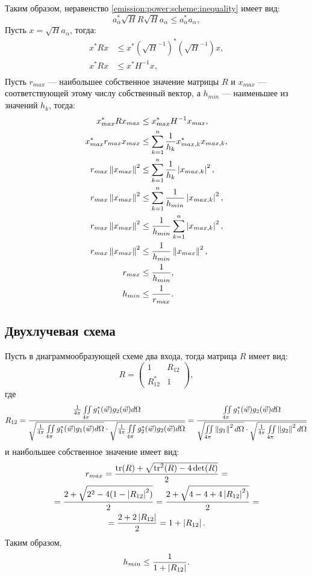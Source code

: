 Таким образом, неравенство \eqref{emission:power:scheme:inequality} имеет вид:
\[
    a_\alpha^* \sqrt{H} R \sqrt{H} a_\alpha \le a_\alpha^* a_\alpha ,
\]
Пусть $x = \sqrt{H} a_\alpha$, тогда:
\begin{align*}
    x^* R x & \le x^* (\sqrt{H}^{-1})^* (\sqrt{H}^{-1}) x , \\
    x^* R x & \le x^* H^{-1} x , \\
\end{align*}
Пусть $r_{max}$ --- наибольшее собственное значение матрицы $R$ и $x_{max}$ --- соответствующей этому числу собственный вектор, а $h_{min}$ --- наименьшее из
значений $h_k$, тогда:
\begin{align*}
    x_{max}^* R x_{max} & \le x_{max}^* H^{-1} x_{max} , \\
    x_{max}^* r_{max} x_{max} & \le \sum_{k=1}^n \frac{1}{h_k} x_{max,k}^* x_{max,k} , \\
    r_{max} \left \| x_{max} \right \|^2 & \le \sum_{k=1}^n \frac{1}{h_k} \left | x_{max,k} \right |^2 , \\
    r_{max} \left \| x_{max} \right \|^2 & \le \sum_{k=1}^n \frac{1}{h_{min}} \left | x_{max,k} \right |^2 , \\
    r_{max} \left \| x_{max} \right \|^2 & \le \frac{1}{h_{min}} \sum_{k=1}^n \left | x_{max,k} \right |^2 , \\
    r_{max} \left \| x_{max} \right \|^2 & \le \frac{1}{h_{min}} \left \| x_{max} \right \|^2 , \\
    r_{max} & \le \frac{1}{h_{min}} , \\
    h_{min} & \le \frac{1}{r_{max}} .
\end{align*}

\subsection{Двухлучевая схема}

Пусть в диаграммообразующей схеме два входа, тогда матрица $R$ имеет вид:
\[
    R
    = \begin{pmatrix}
          1        & R_{12} \\
          R_{12}^* & 1
    \end{pmatrix} ,
\]
где
\[
    R_{12}
    =
    \frac
    {\frac{1}{4 \pi} \iint \limits_{4 \pi} g_1^*(\vec{w}) g_2(\vec{w}) d \Omega}
    {\sqrt{\frac{1}{4 \pi} \iint \limits_{4 \pi} g_1^*(\vec{w}) g_1(\vec{w}) d \Omega} \cdot \sqrt{\frac{1}{4 \pi} \iint \limits_{4 \pi} g_2^*(\vec{w}) g_2(\vec{w}) d \Omega}}
    = \frac
    {\iint \limits_{4 \pi} g_1^*(\vec{w}) g_2(\vec{w}) d \Omega}
    {\sqrt{\iint \limits_{4 \pi} \left \| g_1 \right \|^2 d \Omega} \cdot \sqrt{\frac{1}{4 \pi} \iint \limits_{4 \pi} \left \| g_2 \right \|^2 d \Omega}}
\]
и наибольшее собственное значение имеет вид:
\begin{multline*}
    r_{max}
    = \frac{\operatorname{tr}(R) + \sqrt{\operatorname{tr}^2(R) - 4 \det(R)}}{2} = \\
    = \frac{2 + \sqrt{2^2 - 4 (1 - \left | R_{12} \right |^2)}}{2}
    = \frac{2 + \sqrt{4 - 4 + 4 \left | R_{12} \right |^2)}}{2} = \\
    = \frac{2 + 2 \left | R_{12} \right |}{2}
    = 1 + \left | R_{12} \right | .
\end{multline*}
Таким образом,
\[
    h_{min} \le \frac{1}{1 + \left | R_{12} \right |} .
\]
